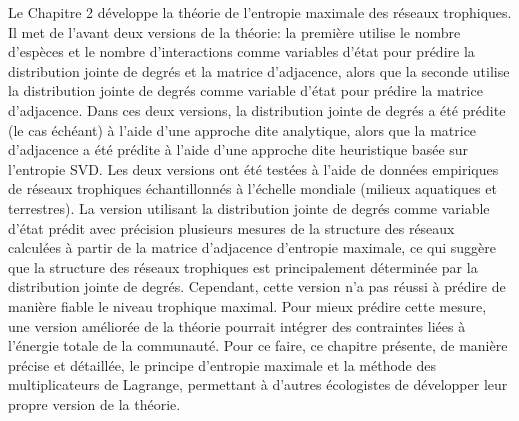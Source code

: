 Le Chapitre 2 développe la théorie de l'entropie maximale des réseaux
trophiques. Il met de l'avant deux versions de la théorie: la première utilise
le nombre d'espèces et le nombre d'interactions comme variables d'état pour
prédire la distribution jointe de degrés et la matrice d'adjacence, alors que la
seconde utilise la distribution jointe de degrés comme variable d'état pour
prédire la matrice d'adjacence. Dans ces deux versions, la distribution jointe
de degrés a été prédite (le cas échéant) à l'aide d'une approche dite
analytique, alors que la matrice d'adjacence a été prédite à l'aide d'une
approche dite heuristique basée sur l'entropie SVD. Les deux versions ont été
testées à l'aide de données empiriques de réseaux trophiques échantillonnés à
l'échelle mondiale (milieux aquatiques et terrestres). La version utilisant la
distribution jointe de degrés comme variable d'état prédit avec précision
plusieurs mesures de la structure des réseaux calculées à partir de la matrice
d'adjacence d'entropie maximale, ce qui suggère que la structure des réseaux
trophiques est principalement déterminée par la distribution jointe de degrés.
Cependant, cette version n'a pas réussi à prédire de manière fiable le niveau
trophique maximal. Pour mieux prédire cette mesure, une version améliorée de la
théorie pourrait intégrer des contraintes liées à l'énergie totale de la
communauté. Pour ce faire, ce chapitre présente, de manière précise et
détaillée, le principe d'entropie maximale et la méthode des multiplicateurs de
Lagrange, permettant à d'autres écologistes de développer leur propre version de
la théorie.

\endinput
